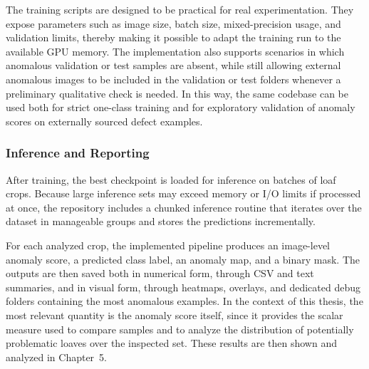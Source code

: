 The training scripts are designed to be practical for real experimentation. They expose parameters such as image size, batch size, mixed-precision usage, and validation limits, thereby making it possible to adapt the training run to the available GPU memory.\cite{labby_thesis_repo_2026} The implementation also supports scenarios in which anomalous validation or test samples are absent, while still allowing external anomalous images to be included in the validation or test folders whenever a preliminary qualitative check is needed. In this way, the same codebase can be used both for strict one-class training and for exploratory validation of anomaly scores on externally sourced defect examples.

\subsubsection{Inference and Reporting}
After training, the best checkpoint is loaded for inference on batches of loaf crops. Because large inference sets may exceed memory or I/O limits if processed at once, the repository includes a chunked inference routine that iterates over the dataset in manageable groups and stores the predictions incrementally.\cite{labby_thesis_repo_2026}

For each analyzed crop, the implemented pipeline produces an image-level anomaly score, a predicted class label, an anomaly map, and a binary mask. The outputs are then saved both in numerical form, through CSV and text summaries, and in visual form, through heatmaps, overlays, and dedicated debug folders containing the most anomalous examples.\cite{labby_thesis_repo_2026} In the context of this thesis, the most relevant quantity is the anomaly score itself, since it provides the scalar measure used to compare samples and to analyze the distribution of potentially problematic loaves over the inspected set.
These results are then shown and analyzed in Chapter~5.
